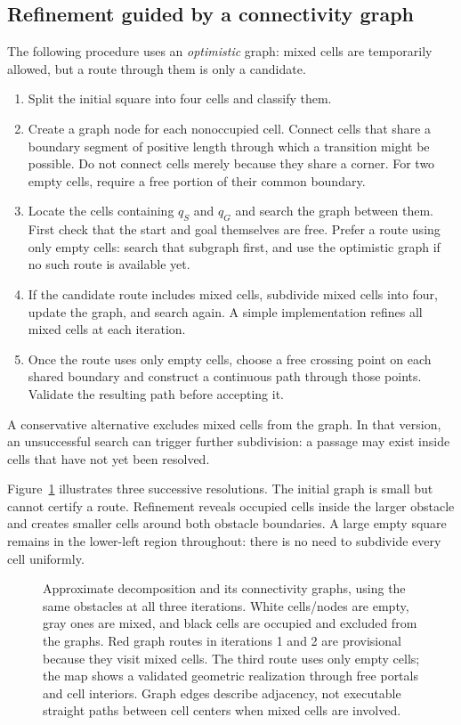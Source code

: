 \subsection{Refinement guided by a connectivity graph}
The following procedure uses an \emph{optimistic} graph: mixed cells are
temporarily allowed, but a route through them is only a candidate.
\begin{enumerate}
\item Split the initial square into four cells and classify them.
\item Create a graph node for each nonoccupied cell. Connect cells that
share a boundary segment of positive length through which a transition
might be possible. Do not connect cells merely because they share a corner.
For two empty cells, require a free portion of their common boundary.
\item Locate the cells containing $q_S$ and $q_G$ and search the graph
between them. First check that the start and goal themselves are free.
Prefer a route using only empty cells: search that subgraph first, and
use the optimistic graph if no such route is available yet.
\item If the candidate route includes mixed cells, subdivide mixed cells
into four, update the graph, and search again. A simple implementation
refines all mixed cells at each iteration.
\item Once the route uses only empty cells, choose a free crossing point
on each shared boundary and construct a continuous path through those
points. Validate the resulting path before accepting it.
\end{enumerate}
A conservative alternative excludes mixed cells from the graph. In that
version, an unsuccessful search can trigger further subdivision: a passage
may exist inside cells that have not yet been resolved.

Figure~\ref{fig:l13-quadtree} illustrates three successive resolutions.
The initial graph is small but cannot certify a route. Refinement reveals
occupied cells inside the larger obstacle and creates smaller cells around
both obstacle boundaries. A large empty square remains in the lower-left
region throughout: there is no need to subdivide every cell uniformly.

\begin{figure}[p]
\centering
\caption{Approximate decomposition and its connectivity graphs, using the
same obstacles at all three iterations. White cells/nodes are empty,
gray ones are mixed, and black cells are occupied and excluded from the
graphs. Red graph routes in iterations 1 and 2 are provisional because
they visit mixed cells. The third route uses only empty cells; the map
shows a validated geometric realization through free portals and cell
interiors. Graph edges describe adjacency, not executable straight paths
between cell centers when mixed cells are involved.}
\label{fig:l13-quadtree}
\end{figure}

